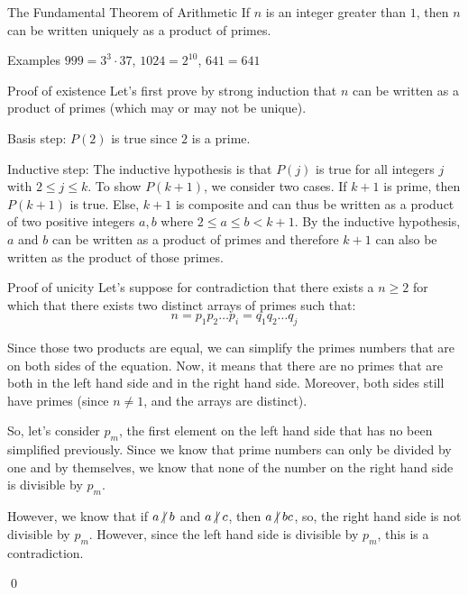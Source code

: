 \documentclass[a4paper]{article}
\begin{document}
\begin{parag}{The Fundamental Theorem of Arithmetic}
    If $n$ is an integer greater than $1$, then $n$ can be written uniquely as a product of primes.

    \begin{subparag}{Examples}
        $999 = 3^3 \cdot 37$, $1024 = 2^{10}$, $641 = 641$
    \end{subparag}

    \begin{subparag}{Proof of existence}
        Let's first prove by strong induction that $n$ can be written as a product of primes (which may or may not be unique).

        Basis step: $P\left(2\right)$ is true since $2$ is a prime.

        Inductive step: The inductive hypothesis is that $P\left(j\right)$ is true for all integers $j$ with $2 \leq j \leq k$. To show $P\left(k+1\right)$, we consider two cases. If $k+1$ is prime, then $P\left(k+1\right)$ is true. Else, $k+1$ is composite and can thus be written as a product of two positive integers $a, b$ where $2 \leq a \leq b < k+1$. By the inductive hypothesis, $a$ and $b$ can be written as a product of primes and therefore $k+1$ can also be written as the product of those primes.
    \end{subparag}

    \begin{subparag}{Proof of unicity}
        Let's suppose for contradiction that there exists a $n \geq 2$ for which that there exists two distinct arrays of primes such that: 
        \[n = p_1 p_2 \ldots p_i = q_1 q_2 \ldots q_j\]
        
        Since those two products are equal, we can simplify the primes numbers that are on both sides of the equation. Now, it means that there are no primes that are both in the left hand side and in the right hand side. Moreover, both sides still have primes (since $n \neq 1$, and the arrays are distinct).

        So, let's consider $p_m$, the first element on the left hand side that has no been simplified previously. Since we know that prime numbers can only be divided by one and by themselves, we know that none of the number on the right hand side is divisible by $p_m$.

        However, we know that if $a \ndivides b$ and $a \ndivides c$, then $a \ndivides bc$, so, the right hand side is not divisible by $p_m$. However, since the left hand side is divisible by $p_m$, this is a contradiction.

        \qed
    \end{subparag}
    
\end{parag}
\end{document}
